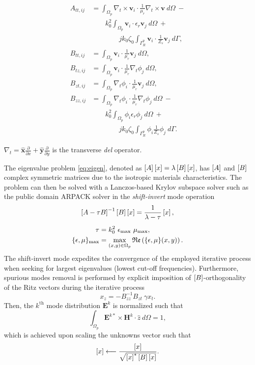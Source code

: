 \begin{equation*}
\begin{aligned}
A_{tt,ij} &= \int_{\Omega_p} \nabla_t \times \mathbf{v}_i  \cdot \frac{1}{\mu_r} \nabla_t \times \mathbf{v} \ d\Omega \ - \\
 & \qquad k_0^2 \int_{\Omega_p} \mathbf{v}_i  \cdot \epsilon_r \mathbf{v}_j \ d\Omega \ + \\ 
&  \qquad \qquad j k_0 \zeta_0
\int_{\Gamma_R^p} \mathbf{v}_i  \cdot \frac{1}{Z_s} \mathbf{v}_j \ d\Gamma, \\
B_{tt,ij} &= \int_{\Omega_p} \mathbf{v}_i  \cdot  \frac{1}{\mu_r}\mathbf{v}_j \ d\Omega, \\
B_{tz,ij} &= \int_{\Omega_p} \mathbf{v}_i  \cdot  \frac{1}{\mu_r}\nabla_t \phi_j \ d\Omega, \\
B_{zt,ij} &= \int_{\Omega_p} \nabla_t \phi_i  \cdot  \frac{1}{\mu_r}\mathbf{v}_j \ d\Omega, \\
B_{zz,ij} &= \int_{\Omega_p} \nabla_t \phi_i  \cdot  \frac{1}{\mu_r}\nabla_t \phi_j \ d\Omega \ - \\
& \qquad k_0^2 \int_{\Omega_p} \phi_i \epsilon_r \phi_j \ d\Omega \ +\\
& \qquad \qquad j k_0 \zeta_0 \int_{\Gamma_R^p} \phi_i \frac{1}{Z_s} \phi_j \ d\Gamma.
\end{aligned}
\end{equation*}

\noindent $\nabla_t = \hat{\mathbf{x}} \frac{\partial}{\partial x} + \hat{\mathbf{y}} \frac{\partial}{\partial y}$ is the transverse \textit{del} operator.
%

The eigenvalue problem \eqref{eq:eigen}, denoted as $\left[A\right]\left[{{x}}\right] = \lambda \left[B\right]\left[{{x}}\right]$, has $\left[A\right]$ and $\left[B\right]$ complex symmetric matrices due to the isotropic materials characteristics. The problem can then be solved with a Lanczos-based Krylov subspace solver \cite{farle2004finite} such as the public domain ARPACK solver	\cite{lehoucq1998arpack} in the \textit{shift-invert} mode operation
%
\begin{gather}
\left[ A-\tau B \right]^{-1} \left[B\right] \left[{{x}}\right] =  \frac{1}{\lambda-\tau} \left[{{x}}\right], \nonumber \\[5pt]
\begin{aligned}
\tau &= k_0^2 \ \epsilon_\text{max} \ \mu_\text{max}, \\
\{\epsilon,\mu\}_\text{max} &= \max\limits_{(x,y)\in\Omega_p} \mathfrak{Re}\left( \{\epsilon,\mu\}(x,y) \right).
\end{aligned} \nonumber
\end{gather}
%
\noindent The shift-invert mode expedites the convergence of the employed iterative process when seeking for largest eigenvalues (lowest cut-off frequencies). Furthermore, spurious modes removal is performed by explicit imposition of $\left[B\right]$-orthogonality of the Ritz vectors during the iterative process
%
$$
x_{z}  = - B_{zz}^{-1} B_{zt} \ \gamma x_{t}.
$$
%
Then, the $k^\mathrm{th}$ mode distribution $\mathbf{E}^k$ is normalized such that
%
$$
\int_{\Omega_p}  \mathbf{E}^{k*}  \times  \mathbf{H}^k  \cdot \hat{z} \ d\Omega = 1,
$$
%
\noindent which is achieved upon scaling the unknowns vector such that 
$$ \left[{{x}}\right] \longleftarrow \frac{\left[{{x}}\right]}{\sqrt{ \left[{{x}}\right]^* \left[B\right] \left[{{x}}\right]} }.$$

